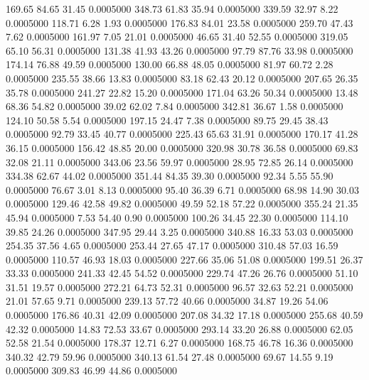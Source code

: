  169.65   84.65   31.45   0.0005000
 348.73   61.83   35.94   0.0005000
 339.59   32.97    8.22   0.0005000
 118.71    6.28    1.93   0.0005000
 176.83   84.01   23.58   0.0005000
 259.70   47.43    7.62   0.0005000
 161.97    7.05   21.01   0.0005000
  46.65   31.40   52.55   0.0005000
 319.05   65.10   56.31   0.0005000
 131.38   41.93   43.26   0.0005000
  97.79   87.76   33.98   0.0005000
 174.14   76.88   49.59   0.0005000
 130.00   66.88   48.05   0.0005000
  81.97   60.72    2.28   0.0005000
 235.55   38.66   13.83   0.0005000
  83.18   62.43   20.12   0.0005000
 207.65   26.35   35.78   0.0005000
 241.27   22.82   15.20   0.0005000
 171.04   63.26   50.34   0.0005000
  13.48   68.36   54.82   0.0005000
  39.02   62.02    7.84   0.0005000
 342.81   36.67    1.58   0.0005000
 124.10   50.58    5.54   0.0005000
 197.15   24.47    7.38   0.0005000
  89.75   29.45   38.43   0.0005000
  92.79   33.45   40.77   0.0005000
 225.43   65.63   31.91   0.0005000
 170.17   41.28   36.15   0.0005000
 156.42   48.85   20.00   0.0005000
 320.98   30.78   36.58   0.0005000
  69.83   32.08   21.11   0.0005000
 343.06   23.56   59.97   0.0005000
  28.95   72.85   26.14   0.0005000
 334.38   62.67   44.02   0.0005000
 351.44   84.35   39.30   0.0005000
  92.34    5.55   55.90   0.0005000
  76.67    3.01    8.13   0.0005000
  95.40   36.39    6.71   0.0005000
  68.98   14.90   30.03   0.0005000
 129.46   42.58   49.82   0.0005000
  49.59   52.18   57.22   0.0005000
 355.24   21.35   45.94   0.0005000
   7.53   54.40    0.90   0.0005000
 100.26   34.45   22.30   0.0005000
 114.10   39.85   24.26   0.0005000
 347.95   29.44    3.25   0.0005000
 340.88   16.33   53.03   0.0005000
 254.35   37.56    4.65   0.0005000
 253.44   27.65   47.17   0.0005000
 310.48   57.03   16.59   0.0005000
 110.57   46.93   18.03   0.0005000
 227.66   35.06   51.08   0.0005000
 199.51   26.37   33.33   0.0005000
 241.33   42.45   54.52   0.0005000
 229.74   47.26   26.76   0.0005000
  51.10   31.51   19.57   0.0005000
 272.21   64.73   52.31   0.0005000
  96.57   32.63   52.21   0.0005000
  21.01   57.65    9.71   0.0005000
 239.13   57.72   40.66   0.0005000
  34.87   19.26   54.06   0.0005000
 176.86   40.31   42.09   0.0005000
 207.08   34.32   17.18   0.0005000
 255.68   40.59   42.32   0.0005000
  14.83   72.53   33.67   0.0005000
 293.14   33.20   26.88   0.0005000
  62.05   52.58   21.54   0.0005000
 178.37   12.71    6.27   0.0005000
 168.75   46.78   16.36   0.0005000
 340.32   42.79   59.96   0.0005000
 340.13   61.54   27.48   0.0005000
  69.67   14.55    9.19   0.0005000
 309.83   46.99   44.86   0.0005000

